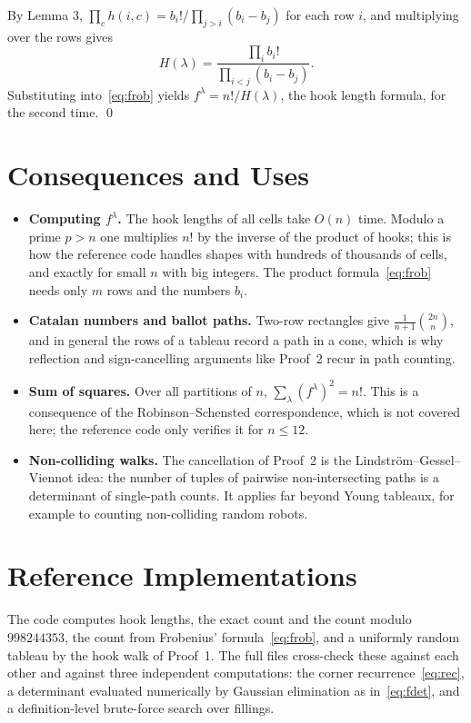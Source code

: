 \documentclass[11pt]{article}
\begin{document}
By Lemma 3, $\prod_c h(i,c)=b_i!\big/\prod_{j>i}(b_i-b_j)$ for each row $i$, and multiplying over the rows gives
\[
  H(\lambda)=\frac{\prod_i b_i!}{\prod_{i<j}(b_i-b_j)} .
\]
Substituting into~\eqref{eq:frob} yields $f^\lambda=n!/H(\lambda)$, the hook length formula, for the second time. \qed

\section{Consequences and Uses}
\begin{itemize}[leftmargin=1.5em]
  \item \textbf{Computing $f^\lambda$.} The hook lengths of all cells take $O(n)$ time. Modulo a prime $p>n$ one multiplies $n!$ by the inverse of the product of hooks; this is how the reference code handles
        shapes with hundreds of thousands of cells, and exactly for small $n$ with big integers. The product formula~\eqref{eq:frob} needs only $m$ rows and the numbers $b_i$.
  \item \textbf{Catalan numbers and ballot paths.} Two-row rectangles give $\frac1{n+1}\binom{2n}{n}$, and in general the rows of a tableau record a path in a cone, which is why reflection and sign-cancelling arguments like Proof~2 recur in path counting.
  \item \textbf{Sum of squares.} Over all partitions of $n$, $\sum_\lambda(f^\lambda)^2=n!$. This is a consequence of the Robinson--Schensted correspondence, which is not covered here; the reference code only verifies it for $n\le12$.
  \item \textbf{Non-colliding walks.} The cancellation of Proof~2 is the Lindstr\"om--Gessel--Viennot idea: the number of tuples of pairwise non-intersecting paths is a determinant of single-path counts.
        It applies far beyond Young tableaux, for example to counting non-colliding random robots.
\end{itemize}

\section{Reference Implementations}
The code computes hook lengths, the exact count and the count modulo $998244353$, the count from Frobenius' formula~\eqref{eq:frob}, and a uniformly random tableau by the hook walk of Proof~1.
The full files cross-check these against each other and against three independent computations: the corner recurrence~\eqref{eq:rec}, a determinant evaluated numerically by Gaussian elimination as in~\eqref{eq:fdet},
and a definition-level brute-force search over fillings.
\end{document}
